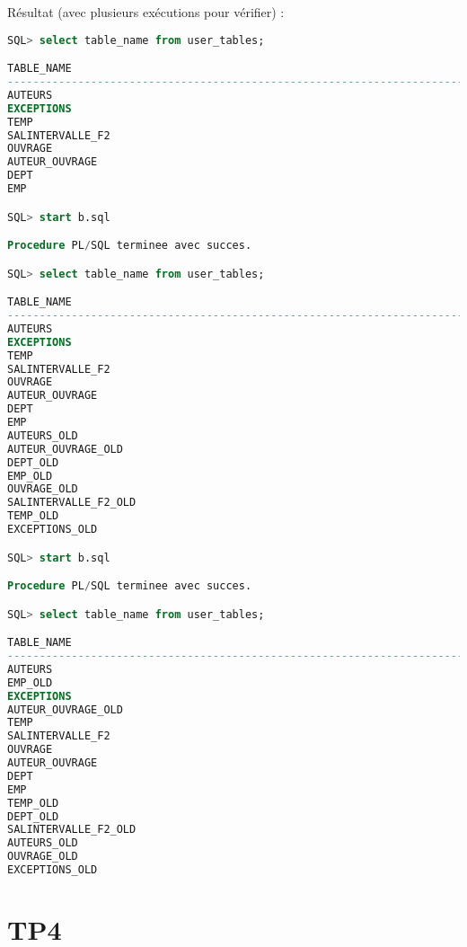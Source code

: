 \documentclass{article}
\begin{document}
Résultat (avec plusieurs exécutions pour vérifier) :
\begin{lstlisting}[language=SQL,
    morekeywords={DECLARE, LOOP, TYPE, FOR, IF, IS, OPEN, FETCH, DBMS_OUTPUT, PUT_LINE}]
SQL> select table_name from user_tables;

TABLE_NAME
--------------------------------------------------------------------------------
AUTEURS
EXCEPTIONS
TEMP
SALINTERVALLE_F2
OUVRAGE
AUTEUR_OUVRAGE
DEPT
EMP

SQL> start b.sql

Procedure PL/SQL terminee avec succes.

SQL> select table_name from user_tables;

TABLE_NAME
--------------------------------------------------------------------------------
AUTEURS
EXCEPTIONS
TEMP
SALINTERVALLE_F2
OUVRAGE
AUTEUR_OUVRAGE
DEPT
EMP
AUTEURS_OLD
AUTEUR_OUVRAGE_OLD
DEPT_OLD
EMP_OLD
OUVRAGE_OLD
SALINTERVALLE_F2_OLD
TEMP_OLD
EXCEPTIONS_OLD

SQL> start b.sql

Procedure PL/SQL terminee avec succes.

SQL> select table_name from user_tables;

TABLE_NAME
--------------------------------------------------------------------------------
AUTEURS
EMP_OLD
EXCEPTIONS
AUTEUR_OUVRAGE_OLD
TEMP
SALINTERVALLE_F2
OUVRAGE
AUTEUR_OUVRAGE
DEPT
EMP
TEMP_OLD
DEPT_OLD
SALINTERVALLE_F2_OLD
AUTEURS_OLD
OUVRAGE_OLD
EXCEPTIONS_OLD
\end{lstlisting}

\newpage
\section{TP4}
\end{document}
